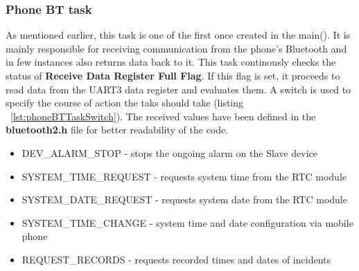 \documentclass[12pt,a4paper]{article}
\begin{document}
        \subsubsection*{Phone BT task}
        As mentioned earlier, this task is one of the first once created in the main(). It is mainly responsible for receiving communication from the phone's Bluetooth and in few instances also returns data back to it. This task continously checks the status of {\bfseries Receive Data Register Full Flag}. If this flag is set, it proceeds to read data from the UART3 data register and evaluates them. A switch is used to specify the course of action the taks should take (listing ~\ref{lst:phoneBTTaskSwitch}). The received values have been defined in the {\bfseries bluetooth2.h} file for better readability of the code.\\
        
		\begin{itemize}[topsep=4pt,itemsep=1pt]
            \item DEV\_ALARM\_STOP - stops the ongoing alarm on the Slave device
            \item SYSTEM\_TIME\_REQUEST - requests system time from the RTC module   
            \item SYSTEM\_DATE\_REQUEST - requests system date from the RTC module  
            \item SYSTEM\_TIME\_CHANGE - system time and date configuration via mobile phone  
            \item REQUEST\_RECORDS - requests recorded times and dates of incidents  
		\end{itemize}
        
\end{document}
